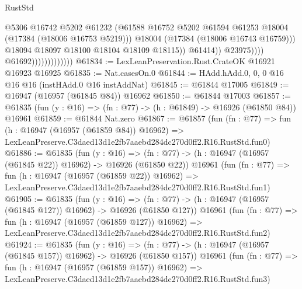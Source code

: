 \begin{lexlean}{RustStd}
\begin{coremodule}
                                                @5306
                                                @16742
                                                @5202
                                                @61232
                                                (@61588
                                                  @16752
                                                  @5202
                                                  @61594
                                                  @61253
                                                  @18004
                                                  (@17384 (@18006 @16753 @5219)))
                                                @18004
                                                (@17384 (@18006 @16743 @16759)))
                                              @18094
                                              @18097
                                              @18100
                                              @18104
                                              @18109
                                              @18115))
                                          @61414))
                                      @23975))))
                              @61692)))))))))))))
@61834 := LexLeanPreservation.Rust.CrateOK @16921 @16923 @16925
@61835 := Nat.casesOn.{0}
@61844 := HAdd.hAdd.{0, 0, 0} @16 @16 @16 (instHAdd.{0} @16 instAddNat)
@61845 := @61844 @17005
@61849 := @16947 (@16957 (@61845 @84)) @16962
@61850 := @61844 @17003
@61857 := @61835 (fun (y : @16) => (fn : @77) -> (h : @61849) -> @16926 (@61850 @84)) @16961
@61859 := @61844 Nat.zero
@61867 := @61857
    (fun (fn : @77) =>
    fun (h : @16947 (@16957 (@61859 @84)) @16962) =>
    LexLeanPreserve.C3daed13d1e2fb7aaebd284dc270d0ff2.R16.RustStd.fun0)
@61886 := @61835
    (fun (y : @16) =>
    (fn : @77) -> (h : @16947 (@16957 (@61845 @22)) @16962) -> @16926 (@61850 @22))
    @16961
    (fun (fn : @77) =>
    fun (h : @16947 (@16957 (@61859 @22)) @16962) =>
    LexLeanPreserve.C3daed13d1e2fb7aaebd284dc270d0ff2.R16.RustStd.fun1)
@61905 := @61835
    (fun (y : @16) =>
    (fn : @77) -> (h : @16947 (@16957 (@61845 @127)) @16962) -> @16926 (@61850 @127))
    @16961
    (fun (fn : @77) =>
    fun (h : @16947 (@16957 (@61859 @127)) @16962) =>
    LexLeanPreserve.C3daed13d1e2fb7aaebd284dc270d0ff2.R16.RustStd.fun2)
@61924 := @61835
    (fun (y : @16) =>
    (fn : @77) -> (h : @16947 (@16957 (@61845 @157)) @16962) -> @16926 (@61850 @157))
    @16961
    (fun (fn : @77) =>
    fun (h : @16947 (@16957 (@61859 @157)) @16962) =>
    LexLeanPreserve.C3daed13d1e2fb7aaebd284dc270d0ff2.R16.RustStd.fun3)

\end{coremodule}
\end{lexlean}
